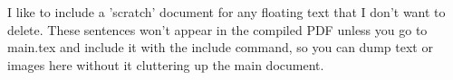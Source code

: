 I like to include a 'scratch' document for any floating text that I don't want to delete. These sentences won't appear in the compiled PDF unless you go to main.tex and include it with the include command, so you can dump text or images here without it cluttering up the main document.